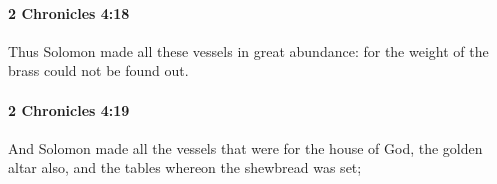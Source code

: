 		\paragraph{2 Chronicles 4:18} %
			\label{2CHRONICLES-4-18}

			Thus Solomon made all these vessels in great abundance: for the weight of the brass could not be found out.


		\paragraph{2 Chronicles 4:19} %
			\label{2CHRONICLES-4-19}

			And Solomon made all the vessels that were for the house of God, the golden altar also, and the tables whereon the shewbread was set;


